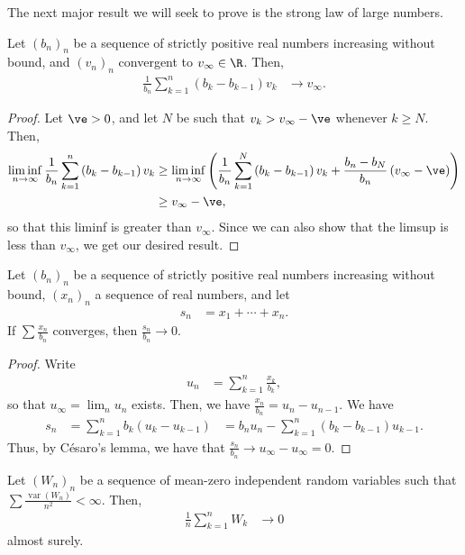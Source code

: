 \documentclass[10pt]{mypackage}
\begin{document}
The next major result we will seek to prove is the strong law of large numbers.
\begin{lemma}
  Let $\left( b_n \right)_n$ be a sequence of strictly positive real numbers increasing without bound, and $\left( v_n \right)_n$ convergent to $v_{\infty}\in \R$. Then,
  \begin{align*}
    \frac{1}{b_n}\sum_{k=1}^{n} \left( b_k-b_{k-1} \right)v_k &\to v_{\infty}.
  \end{align*}
\end{lemma}
\begin{proof}
  Let $\ve > 0$, and let $N$ be such that $v_k > v_{\infty}-\ve$ whenever $k\geq N$. Then,
  \begin{align*}
    \liminf_{n\to\infty} \frac{1}{b_n}\sum_{k=1}^{n} \left( b_k-b_{k-1} \right)v_k &\geq \liminf_{n\to\infty} \left( \frac{1}{b_n}\sum_{k=1}^{N}\left( b_k-b_{k-1} \right)v_k + \frac{b_n-b_N}{b_n}\left( v_{\infty}-\ve \right) \right)\\
                                                                                   &\geq v_{\infty}-\ve,
  \end{align*}
  so that this liminf is greater than $v_{\infty}$. Since we can also show that the limsup is less than $v_{\infty}$, we get our desired result.
\end{proof}
\begin{lemma}
  Let $\left( b_n \right)_n$ be a sequence of strictly positive real numbers increasing without bound, $\left( x_n \right)_n$ a sequence of real numbers, and let
  \begin{align*}
    s_n &= x_1 + \cdots + x_n.
  \end{align*}
  If $\sum \frac{x_n}{b_n}$ converges, then $\frac{s_n}{b_n}\to 0$.
\end{lemma}
\begin{proof}
  Write
  \begin{align*}
    u_n &= \sum_{k=1}^{n}\frac{x_k}{b_k},
  \end{align*}
  so that $u_{\infty} = \lim_{n}u_n$ exists. Then, we have $\frac{x_n}{b_n} = u_n-u_{n-1}$. We have
  \begin{align*}
    s_n &= \sum_{k=1}^{n}b_k\left( u_k-u_{k-1} \right) &= b_nu_n-\sum_{k=1}^{n}\left( b_{k}-b_{k-1} \right)u_{k-1}.
  \end{align*}
  Thus, by Césaro's lemma, we have that $\frac{s_n}{b_n}\to u_{\infty}-u_{\infty} = 0$.
\end{proof}
\begin{lemma}
  Let $\left( W_n \right)_n$ be a sequence of mean-zero independent random variables such that $\sum \frac{\operatorname{var}\left( W_n \right)}{n^2} < \infty$. Then,
  \begin{align*}
    \frac{1}{n}\sum_{k=1}^{n}W_k &\to 0
  \end{align*}
  almost surely.
\end{lemma}
\end{document}
